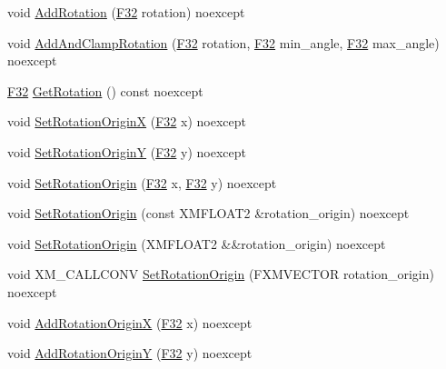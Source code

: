 \begin{DoxyCompactItemize}
\item 
void \hyperlink{classmage_1_1_texture_transform_a025cf31a0005883a3b351907121a5469}{Add\+Rotation} (\hyperlink{namespacemage_aa97e833b45f06d60a0a9c4fc22ae02c0}{F32} rotation) noexcept
\item 
void \hyperlink{classmage_1_1_texture_transform_ab66d7a0aeee748829636290c6222a26a}{Add\+And\+Clamp\+Rotation} (\hyperlink{namespacemage_aa97e833b45f06d60a0a9c4fc22ae02c0}{F32} rotation, \hyperlink{namespacemage_aa97e833b45f06d60a0a9c4fc22ae02c0}{F32} min\+\_\+angle, \hyperlink{namespacemage_aa97e833b45f06d60a0a9c4fc22ae02c0}{F32} max\+\_\+angle) noexcept
\item 
\hyperlink{namespacemage_aa97e833b45f06d60a0a9c4fc22ae02c0}{F32} \hyperlink{classmage_1_1_texture_transform_ade561a56fa2e80b70c74620277a9afa1}{Get\+Rotation} () const noexcept
\item 
void \hyperlink{classmage_1_1_texture_transform_a7df3d49e14ce92fc8071f15d35018eb8}{Set\+Rotation\+OriginX} (\hyperlink{namespacemage_aa97e833b45f06d60a0a9c4fc22ae02c0}{F32} x) noexcept
\item 
void \hyperlink{classmage_1_1_texture_transform_af5808699dd47eb6672391e5725a0b7ea}{Set\+Rotation\+OriginY} (\hyperlink{namespacemage_aa97e833b45f06d60a0a9c4fc22ae02c0}{F32} y) noexcept
\item 
void \hyperlink{classmage_1_1_texture_transform_a86667569140479a6b7bf6e1987f88c7c}{Set\+Rotation\+Origin} (\hyperlink{namespacemage_aa97e833b45f06d60a0a9c4fc22ae02c0}{F32} x, \hyperlink{namespacemage_aa97e833b45f06d60a0a9c4fc22ae02c0}{F32} y) noexcept
\item 
void \hyperlink{classmage_1_1_texture_transform_aa870754a35b1f4863b0a5cd3fee2ab95}{Set\+Rotation\+Origin} (const X\+M\+F\+L\+O\+A\+T2 \&rotation\+\_\+origin) noexcept
\item 
void \hyperlink{classmage_1_1_texture_transform_a82e94cf27ae9739bac742f794910e199}{Set\+Rotation\+Origin} (X\+M\+F\+L\+O\+A\+T2 \&\&rotation\+\_\+origin) noexcept
\item 
void X\+M\+\_\+\+C\+A\+L\+L\+C\+O\+NV \hyperlink{classmage_1_1_texture_transform_a41aebcbc263a678157081986a72f52af}{Set\+Rotation\+Origin} (F\+X\+M\+V\+E\+C\+T\+OR rotation\+\_\+origin) noexcept
\item 
void \hyperlink{classmage_1_1_texture_transform_a591aacd1662da3de581d440d921a99df}{Add\+Rotation\+OriginX} (\hyperlink{namespacemage_aa97e833b45f06d60a0a9c4fc22ae02c0}{F32} x) noexcept
\item 
void \hyperlink{classmage_1_1_texture_transform_a5d3dd574b9471f4ae1162819abc394bf}{Add\+Rotation\+OriginY} (\hyperlink{namespacemage_aa97e833b45f06d60a0a9c4fc22ae02c0}{F32} y) noexcept

\end{DoxyCompactItemize}
